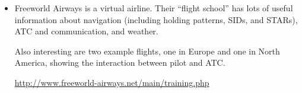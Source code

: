 \begin{itemize}


\item Freeworld Airways is a virtual airline.  Their ``flight school''
  has lots of useful information about navigation (including holding
  patterns, SIDs, and STARs), ATC and communication, and weather.

  Also interesting are two example flights, one in Europe and one in
  North America, showing the interaction between pilot and ATC.

  \url{http://www.freeworld-airways.net/main/training.php}

\end{itemize}
